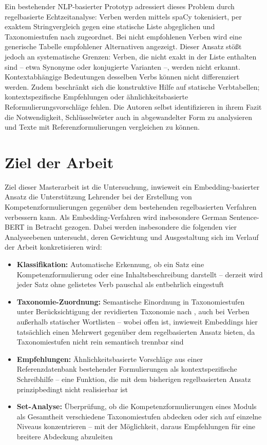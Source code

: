 \documentclass[12pt,a4paper]{article}
\begin{document}
Ein bestehender NLP-basierter Prototyp \citep{LothKonert2022} adressiert dieses Problem durch regelbasierte Echtzeitanalyse: Verben werden mittels spaCy tokenisiert, per exaktem Stringvergleich gegen eine statische Liste abgeglichen und Taxonomiestufen nach \citet{Bloom1956} zugeordnet. Bei nicht empfohlenen Verben wird eine generische Tabelle empfohlener Alternativen angezeigt. Dieser Ansatz st\"o\ss t jedoch an systematische Grenzen: Verben, die nicht exakt in der Liste enthalten sind -- etwa Synonyme oder konjugierte Varianten --, werden nicht erkannt. Kontextabh\"angige Bedeutungen desselben Verbs k\"onnen nicht differenziert werden. Zudem beschr\"ankt sich die konstruktive Hilfe auf statische Verbtabellen; kontextspezifische Empfehlungen oder \"ahnlichkeitsbasierte Reformulierungsvorschl\"age fehlen. Die Autoren selbst identifizieren in ihrem Fazit die Notwendigkeit, Schl\"usselw\"orter auch in abgewandelter Form zu analysieren und Texte mit Referenzformulierungen vergleichen zu k\"onnen.

\section{Ziel der Arbeit}

Ziel dieser Masterarbeit ist die Untersuchung, inwieweit ein Embedding-basierter Ansatz die Unterst\"utzung Lehrender bei der Erstellung von Kompetenzformulierungen gegen\"uber dem bestehenden regelbasierten Verfahren verbessern kann. Als Embedding-Verfahren wird insbesondere German Sentence-BERT \citep{ReimersGurevych2019} in Betracht gezogen. Dabei werden insbesondere die folgenden vier Analyseebenen untersucht, deren Gewichtung und Ausgestaltung sich im Verlauf der Arbeit konkretisieren wird:

\begin{itemize}[leftmargin=1.5em, itemsep=2pt]
  \item \textbf{Klassifikation:} Automatische Erkennung, ob ein Satz eine Kompetenzformulierung oder eine Inhaltsbeschreibung darstellt -- derzeit wird jeder Satz ohne gelistetes Verb pauschal als \glqq entbehrlich\grqq{} eingestuft
  \item \textbf{Taxonomie-Zuordnung:} Semantische Einordnung in Taxonomiestufen unter Ber\"ucksichtigung der revidierten Taxonomie nach \citet{AndersonKrathwohl2001}, auch bei Verben au\ss erhalb statischer Wortlisten -- wobei offen ist, inwieweit Embeddings hier tats\"achlich einen Mehrwert gegen\"uber dem regelbasierten Ansatz bieten, da Taxonomiestufen nicht rein semantisch trennbar sind
  \item \textbf{Empfehlungen:} \"Ahnlichkeitsbasierte Vorschl\"age aus einer Referenzdatenbank bestehender Formulierungen als kontextspezifische Schreibhilfe -- eine Funktion, die mit dem bisherigen regelbasierten Ansatz prinzipbedingt nicht realisierbar ist
  \item \textbf{Set-Analyse:} \"Uberpr\"ufung, ob die Kompetenzformulierungen eines Moduls als Gesamtheit verschiedene Taxonomiestufen abdecken oder sich auf einzelne Niveaus konzentrieren -- mit der M\"oglichkeit, daraus Empfehlungen f\"ur eine breitere Abdeckung abzuleiten
\end{itemize}
\end{document}
